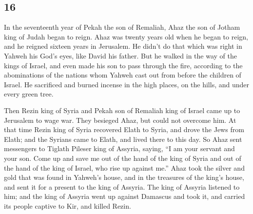 \begin{paracol}{2}
\switchcolumn
\begin{otherlanguage}{english}

\hypertarget{section-31}{%
\section{16}\label{section-31}}

 In the seventeenth year of Pekah the son of Remaliah,
Ahaz the son of Jotham king of Judah began to reign.  Ahaz
was twenty years old when he began to reign, and he reigned sixteen
years in Jerusalem. He didn't do that which was right in Yahweh his
God's eyes, like David his father.  But he walked in the
way of the kings of Israel, and even made his son to pass through the
fire, according to the abominations of the nations whom Yahweh cast out
from before the children of Israel.  He sacrificed and
burned incense in the high places, on the hills, and under every green
tree.

 Then Rezin king of Syria and Pekah son of Remaliah king
of Israel came up to Jerusalem to wage war. They besieged Ahaz, but
could not overcome him.  At that time Rezin king of Syria
recovered Elath to Syria, and drove the Jews from Elath; and the Syrians
came to Elath, and lived there to this day.  So Ahaz sent
messengers to Tiglath Pileser king of Assyria, saying, ``I am your
servant and your son. Come up and save me out of the hand of the king of
Syria and out of the hand of the king of Israel, who rise up against
me.''  Ahaz took the silver and gold that was found in
Yahweh's house, and in the treasures of the king's house, and sent it
for a present to the king of Assyria.  The king of Assyria
listened to him; and the king of Assyria went up against Damascus and
took it, and carried its people captive to Kir, and killed Rezin.


\end{otherlanguage}
\end{paracol}

